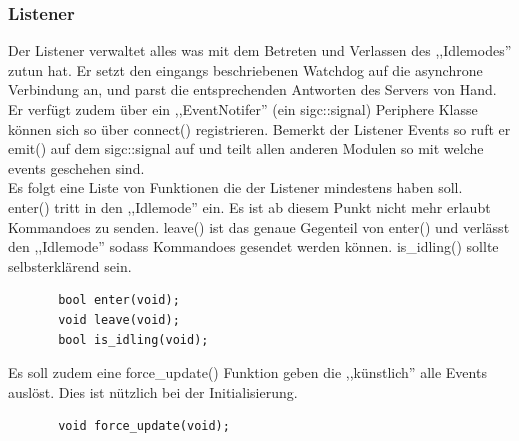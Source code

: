 \subsubsection{Listener}
Der Listener verwaltet alles was mit dem Betreten und Verlassen des ,,Idlemodes''
zutun hat. Er setzt den eingangs beschriebenen Watchdog auf die asynchrone Verbindung an,
und parst die entsprechenden Antworten des Servers von Hand. 
\\
Er verfügt zudem über ein ,,EventNotifer'' (ein sigc::signal)
Periphere Klasse können sich so über connect() registrieren.
Bemerkt der Listener Events so ruft er emit() auf dem sigc::signal auf
und teilt allen anderen Modulen so mit welche events geschehen sind.
\\
Es folgt eine Liste von Funktionen die der Listener mindestens haben soll.
\\
enter() tritt in den ,,Idlemode'' ein. Es ist ab diesem Punkt nicht mehr erlaubt Kommandoes zu senden.
leave() ist das genaue Gegenteil von enter() und verlässt den ,,Idlemode'' sodass Kommandoes gesendet werden können.  
is\_idling() sollte selbsterklärend sein.
\begin{verbatim}
       bool enter(void);
       void leave(void);
       bool is_idling(void);
\end{verbatim}

Es soll zudem eine force\_update() Funktion geben die ,,künstlich'' alle Events auslöst.
Dies ist nützlich bei der Initialisierung.
\begin{verbatim}
       void force_update(void);
\end{verbatim}

